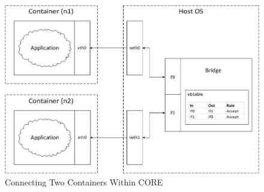\begin{figure}[t] 
      \includegraphics[width=\textwidth]{images/coreInternals.eps} 
    \caption{Connecting Two Containers Within CORE} 
    \label{fig:coreInternals} 
  \end{figure}

